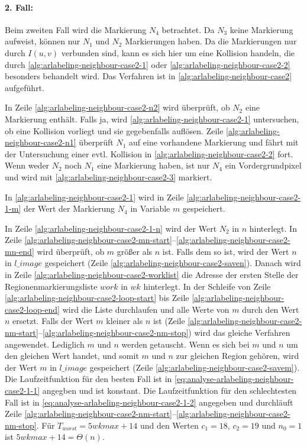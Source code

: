 \paragraph{2. Fall:} %
\label{par:fall_2_}
Beim zweiten Fall wird die Markierung $N_4$ betrachtet. Da $N_3$ keine Markierung aufweist, können nur $N_1$ und $N_2$
 Markierungen haben. Da die Markierungen nur durch $I(u,v)$ verbunden sind, kann es sich hier um eine Kollision
 handeln, die durch \autoref{alg:arlabeling-neighbour-case2-1} oder \autoref{alg:arlabeling-neighbour-case2-2}
 besonders behandelt wird. Das Verfahren ist in \autoref{alg:arlabeling-neighbour-case2} aufgeführt.

In Zeile \ref{alg:arlabeling-neighbour-case2-n2} wird überprüft, ob $N_2$ eine Markierung enthält. Falls ja, wird
 \autoref{alg:arlabeling-neighbour-case2-1} untersuchen, ob eine Kollision vorliegt und sie gegebenfalls auflösen.
 Zeile \ref{alg:arlabeling-neighbour-case2-n1} überprüft $N_1$ auf eine vorhandene Markierung und fährt mit der
 Untersuchung einer evtl. Kollision in \autoref{alg:arlabeling-neighbour-case2-2} fort. Wenn weder $N_2$ noch $N_1$
 eine Markierung haben, ist nur $N_4$ ein Vordergrundpixel und wird mit \autoref{alg:arlabeling-neighbour-case2-3}
 markiert.

In \autoref{alg:arlabeling-neighbour-case2-1} wird in Zeile \ref{alg:arlabeling-neighbour-case2-1-m} der Wert der
 Markierung $N_4$ in Variable $m$ gespeichert.

In Zeile \ref{alg:arlabeling-neighbour-case2-1-n} wird der Wert $N_2$ in $n$ hinterlegt. In Zeile
 \ref{alg:arlabeling-neighbour-case2-mn-start}--\ref{alg:arlabeling-neighbour-case2-mn-end} wird überprüft, ob $m$
 größer als $n$ ist. Falls dem so ist, wird der Wert $n$ in $\mathit{l\_image}$ gespeichert
 (Zeile \ref{alg:arlabeling-neighbour-case2-saven}). Danach wird in Zeile \ref{alg:arlabeling-neighbour-case2-worklist}
 die Adresse der ersten Stelle der Regionenmarkierungsliste $\mathit{work}$ in $wk$ hinterlegt. In der Schleife von
 Zeile \ref{alg:arlabeling-neighbour-case2-loop-start} bis Zeile \ref{alg:arlabeling-neighbour-case2-loop-end} wird die
 Liste durchlaufen und alle Werte von $m$ durch den Wert $n$ ersetzt. Falls der Wert $m$ kleiner als $n$ ist
 (Zeile \ref{alg:arlabeling-neighbour-case2-nm-start}--\ref{alg:arlabeling-neighbour-case2-nm-stop}) wird das gleiche
 Verfahren angewendet. Lediglich $m$ und $n$ werden getauscht. Wenn es sich bei $m$ und $n$ um den gleichen Wert
 handet, und somit $m$ und $n$ zur gleichen Region gehören, wird der Wert $m$ in $\mathit{l\_image}$ gespeichert
 (Zeile \ref{alg:arlabeling-neighbour-case2-savem}). Die Laufzeitfunktion für den besten Fall ist in
 \autoref{eq:analyse-arlabeling-neighbour-case2-1-1} angegben und ist konstant. Die Laufzeitfunktion für den
 schlechtesten Fall ist in \autoref{eq:analyse-arlabeling-neighbour-case2-1-2} angegeben und durchläuft Zeile
 \ref{alg:arlabeling-neighbour-case2-nm-start}--\ref{alg:arlabeling-neighbour-case2-nm-stop}. Für
 $T_{worst}=5 \mathit{wkmax} + 14$ und den Werten $c_{1}=18$, $c_{2}=19$ und $n_{0}=1$ ist
 $5 \mathit{wkmax} + 14 = \Theta(n)$.


